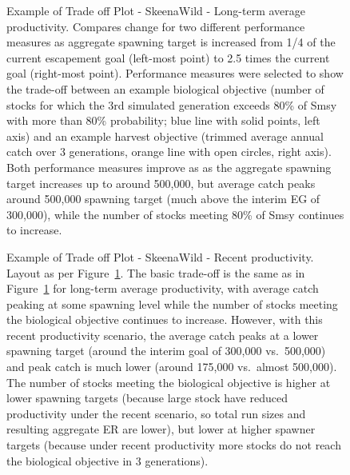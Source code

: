 \documentclass[french,11pt]{book}
\begin{document}
\begin{figure}[htb]

{\centering {} 

}

\caption{Example of Trade off Plot - SkeenaWild - Long-term average productivity. Compares change for two different performance measures as aggregate spawning target is increased from 1/4 of the current escapement goal (left-most point) to 2.5 times the current goal (right-most point). Performance measures were selected to show the trade-off between an example biological objective (number of stocks for which the 3rd simulated generation exceeds 80\% of Smsy with more than 80\% probability; blue line with solid points, left axis) and an example harvest objective (trimmed average annual catch over 3 generations, orange line with open circles, right axis). Both performance measures improve as as the aggregate spawning target increases up to around 500,000, but average catch peaks around 500,000 spawning target (much above the interim EG of 300,000), while the number of stocks meeting 80\% of Smsy continues to increase.}\label{fig:TradeoffPlotSkeenaWildLTAvg}
\end{figure}
\clearpage


\begin{figure}[htb]

{\centering {} 

}

\caption{Example of Trade off Plot - SkeenaWild - Recent productivity. Layout as per Figure~\ref{fig:TradeoffPlotSkeenaWildLTAvg}. The basic trade-off is the same as in Figure~\ref{fig:TradeoffPlotSkeenaWildLTAvg} for long-term average productivity, with average catch peaking at some spawning level while the number of stocks meeting the biological objective continues to increase. However, with this recent productivity scenario, the average catch peaks at a lower spawning target (around the interim goal of 300,000 vs.~500,000) and peak catch is much lower (around 175,000 vs.~almost 500,000). The number of stocks meeting the biological objective is higher at lower spawning targets (because large stock have reduced productivity under the recent scenario, so total run sizes and resulting aggregate ER are lower), but lower at higher spawner targets (because under recent productivity more stocks do not reach the biological objective in 3 generations).}\label{fig:TradeoffPlotSkeenaWildRecent}
\end{figure}
\clearpage
\end{document}
